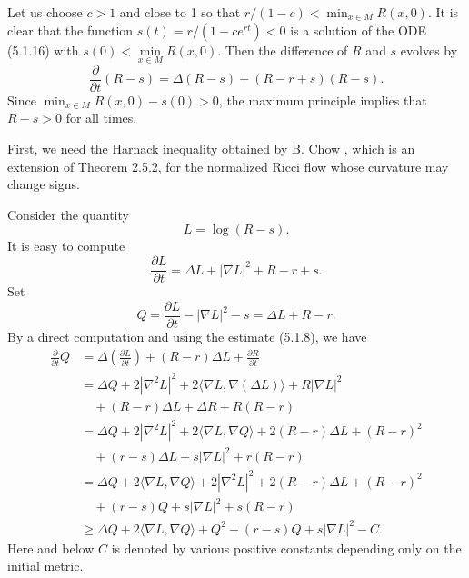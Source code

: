 Let us choose $c>1$ and close to 1 so that $r/(1-c)<\min_{x\in
M}R(x,0)$. It is clear that the function $s(t)=r/(1-ce^{rt})<0$ is
a solution of the ODE (5.1.16) with $s(0)<\min\limits_{x\in
M}R(x,0)$. Then the difference of $R$ and $s$ evolves by \begin{equation}
\frac{\partial }{\partial t}(R-s)=\Delta(R-s)+(R-r+s)(R-s).
\end{equation} Since $\min_{x\in M}R(x,0)-s(0)>0$, the maximum principle
implies that $R-s>0$ for all times.

First, we need the Harnack inequality obtained by B. Chow
\cite{Chow}, which is an extension of Theorem 2.5.2, for the
normalized Ricci flow whose curvature may change signs.

Consider the quantity
$$
L=\log(R-s).
$$
It is easy to compute
$$
\frac{\partial L}{\partial t}=\Delta L+|\nabla L|^2+R-r+s.
$$
Set
$$
Q=\frac{\partial L}{\partial t}-|\nabla L|^2-s=\Delta L+R-r.
$$
By a direct computation and using the estimate (5.1.8), we have
\begin{align*}
\frac{\partial }{\partial t}Q&  = \Delta\left(\frac{\partial
L}{\partial t}\right)
+(R-r)\Delta L+\frac{\partial R}{\partial t}\\
&  =\Delta Q+2|\nabla^2L|^2+2\langle\nabla L,\nabla(\Delta
L)\rangle+R|\nabla L|^2\\
&\quad +(R-r)\Delta L+\Delta R+R(R-r)\\
&  =\Delta Q+2|\nabla^2L|^2+2\langle\nabla L,\nabla
Q\rangle+2(R-r)\Delta L+(R-r)^2\\
&\quad +(r-s)\Delta L+s|\nabla L|^2+r(R-r)\\
&  = \Delta Q+2\langle\nabla L,\nabla Q\rangle
+2|\nabla^2L|^2+2(R-r)\Delta L+(R-r)^2\\
&\quad +(r-s)Q+s|\nabla L|^2+s(R-r)\\
&  \ge \Delta Q+2\langle \nabla L,\nabla
Q\rangle+Q^2+(r-s)Q+s|\nabla L|^2-C.
\end{align*}
Here and below $C$ is denoted by various positive constants
depending only on the initial metric.

